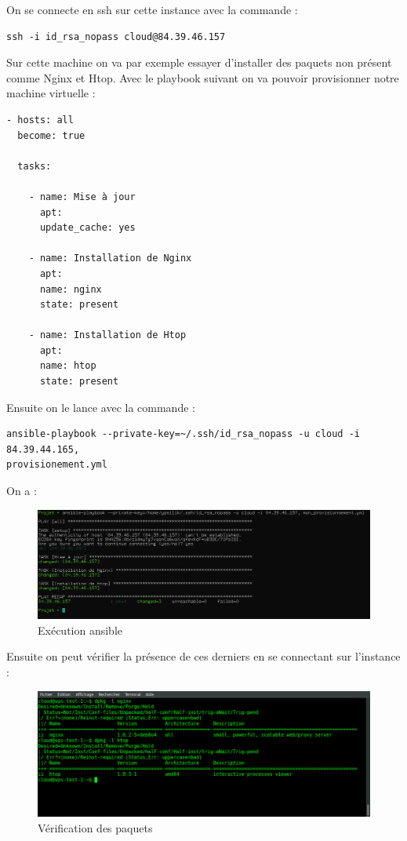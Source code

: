 \documentclass[]{article}
\begin{document}
On se connecte en ssh sur cette instance avec la commande :

\begin{verbatim}
ssh -i id_rsa_nopass cloud@84.39.46.157
\end{verbatim}

Sur cette machine on va par exemple essayer d'installer des paquets non
présent comme Nginx et Htop. Avec le playbook suivant on va pouvoir
provisionner notre machine virtuelle :

\begin{verbatim}
- hosts: all
  become: true

  tasks:

    - name: Mise à jour 
      apt:
      update_cache: yes

    - name: Installation de Nginx
      apt:
      name: nginx
      state: present

    - name: Installation de Htop
      apt:
      name: htop
      state: present
\end{verbatim}

Ensuite on le lance avec la commande :

\begin{verbatim}
ansible-playbook --private-key=~/.ssh/id_rsa_nopass -u cloud -i 84.39.44.165, 
provisionement.yml
\end{verbatim}

On a :

\begin{figure}
\centering
\includegraphics{Images/application.png}
\caption{Exécution ansible}
\end{figure}

Ensuite on peut vérifier la présence de ces derniers en se connectant
sur l'instance :

\begin{figure}
\centering
\includegraphics{Images/verification.png}
\caption{Vérification des paquets}
\end{figure}
\end{document}
